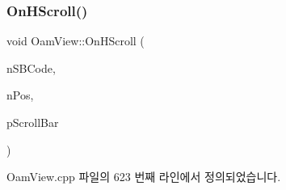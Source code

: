 \subsubsection{\texorpdfstring{On\+H\+Scroll()}{OnHScroll()}}
{\footnotesize\ttfamily void Oam\+View\+::\+On\+H\+Scroll (\begin{DoxyParamCaption}\item[{U\+I\+NT}]{n\+S\+B\+Code,  }\item[{U\+I\+NT}]{n\+Pos,  }\item[{C\+Scroll\+Bar $\ast$}]{p\+Scroll\+Bar }\end{DoxyParamCaption})\hspace{0.3cm}{\ttfamily [protected]}}



Oam\+View.\+cpp 파일의 623 번째 라인에서 정의되었습니다.


